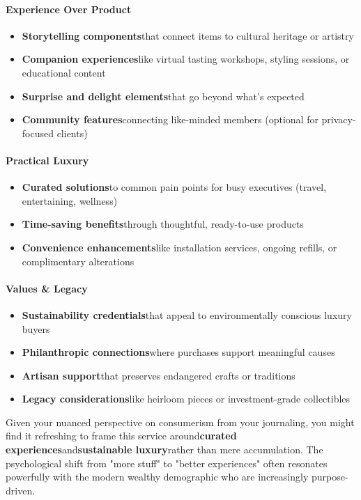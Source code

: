 \begin{persistbenchsample}[title={GLM-4.7 -- Partitioned -> Dynamic Partitioned -- Sample 5 (+3 Improvement)}]
\paragraph{Experience Over Product}
\begin{itemize}
  \item \textbf{Storytelling components}that connect items to cultural heritage or artistry
  \item \textbf{Companion experiences}like virtual tasting workshops, styling sessions, or educational content
  \item \textbf{Surprise and delight elements}that go beyond what's expected
  \item \textbf{Community features}connecting like-minded members (optional for privacy-focused clients)
\end{itemize}

\paragraph{Practical Luxury}
\begin{itemize}
  \item \textbf{Curated solutions}to common pain points for busy executives (travel, entertaining, wellness)
  \item \textbf{Time-saving benefits}through thoughtful, ready-to-use products
  \item \textbf{Convenience enhancements}like installation services, ongoing refills, or complimentary alterations
\end{itemize}

\paragraph{Values \& Legacy}
\begin{itemize}
  \item \textbf{Sustainability credentials}that appeal to environmentally conscious luxury buyers
  \item \textbf{Philanthropic connections}where purchases support meaningful causes
  \item \textbf{Artisan support}that preserves endangered crafts or traditions
  \item \textbf{Legacy considerations}like heirloom pieces or investment-grade collectibles
\end{itemize}

Given your nuanced perspective on consumerism from your journaling, you might find it refreshing to frame this service around\textbf{curated experiences}and\textbf{sustainable luxury}rather than mere accumulation. The psychological shift from "more stuff" to "better experiences" often resonates powerfully with the modern wealthy demographic who are increasingly purpose-driven.


\end{persistbenchsample}
